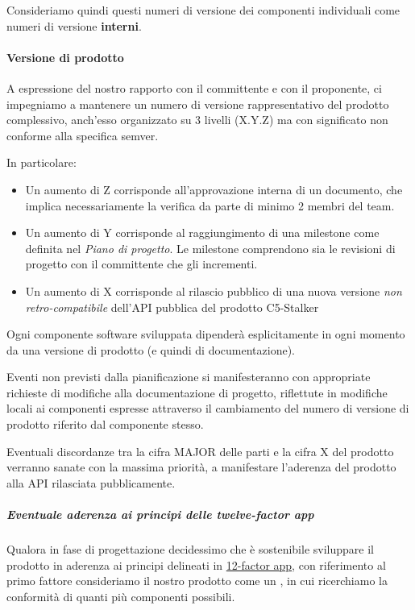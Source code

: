 \documentclass[../norme-di-progetto.tex]{subfiles}
\begin{document}
Consideriamo quindi questi numeri di versione dei componenti individuali come numeri di versione \textbf{interni}.

\paragraph{Versione di prodotto}%
\label{par:versione_di_prodotto}

A espressione del nostro rapporto con il committente e con il proponente, ci impegniamo a mantenere un numero di versione rappresentativo del prodotto complessivo, anch'esso organizzato su 3 livelli (X.Y.Z) ma con significato non conforme alla specifica semver.

In particolare:

\begin{itemize}
  \item Un aumento di Z corrisponde all'approvazione interna di un documento, che implica necessariamente la verifica da parte di minimo 2 membri del team.
  \item Un aumento di Y corrisponde al raggiungimento di una milestone come definita nel \textit{Piano di progetto}. Le milestone comprendono sia le revisioni di progetto con il committente che gli incrementi.
  \item Un aumento di X corrisponde al rilascio pubblico di una nuova versione \textit{non retro-compatibile} dell'API pubblica del prodotto C5-Stalker
\end{itemize}

Ogni componente software sviluppata dipenderà esplicitamente in ogni momento da una versione di prodotto (e quindi di documentazione).

Eventi non previsti dalla pianificazione si manifesteranno con appropriate richieste di modifiche alla documentazione di progetto, riflettute in modifiche locali ai componenti espresse attraverso il cambiamento del numero di versione di prodotto riferito dal componente stesso.

Eventuali discordanze tra la cifra MAJOR delle parti e la cifra X del prodotto verranno sanate con la massima priorità, a manifestare l'aderenza del prodotto alla API rilasciata pubblicamente.

\subparagraph{Eventuale aderenza ai principi delle twelve-factor app}%
\label{subp:eventuale_aderenza_ai_principi_delle_twelve-factor_app}

Qualora in fase di progettazione decidessimo che è sostenibile sviluppare il prodotto in aderenza ai principi delineati in \href{https://12factor.net/codebase}{12-factor app}, con riferimento al primo fattore consideriamo il nostro prodotto come un , in cui ricerchiamo la conformità di quanti più componenti possibili.
\end{document}
